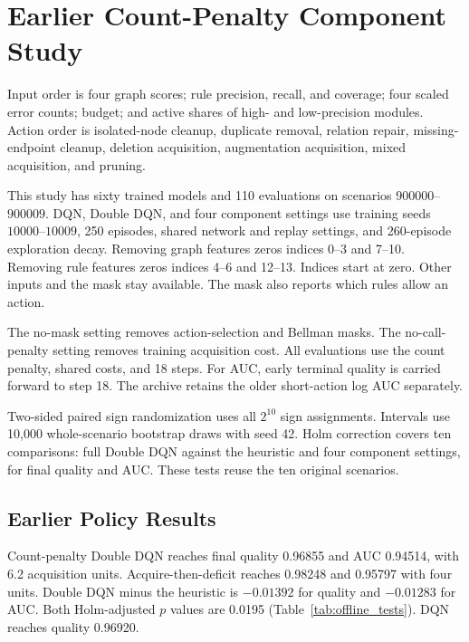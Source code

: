 \section{Earlier Count-Penalty Component Study}

\label{app:impl}

Input order is four graph scores; rule precision, recall, and coverage;
four scaled error counts; budget; and active shares of high- and
low-precision modules. Action order is isolated-node cleanup, duplicate
removal, relation repair, missing-endpoint cleanup, deletion acquisition,
augmentation acquisition, mixed acquisition, and pruning.

This study has sixty trained models and 110 evaluations on scenarios
$900000$--$900009$. DQN, Double DQN, and four component settings use
training seeds $10000$--$10009$, 250 episodes, shared network and replay
settings, and 260-episode exploration decay.
Removing graph features zeros indices 0--3 and 7--10.
Removing rule features zeros indices 4--6 and 12--13.
Indices start at zero. Other inputs and the mask stay available.
The mask also reports which rules allow an action.

The no-mask setting removes action-selection and Bellman masks.
The no-call-penalty setting removes training acquisition cost.
All evaluations use the count penalty, shared costs, and 18 steps.
For AUC, early terminal quality is carried forward to step 18.
The archive retains the older short-action log AUC separately.

Two-sided paired sign randomization uses all $2^{10}$ sign assignments.
Intervals use 10,000 whole-scenario bootstrap draws with seed 42.
Holm correction covers ten comparisons: full Double DQN against
the heuristic and four component settings, for final quality and AUC.
These tests reuse the ten original scenarios.



\subsection{Earlier Policy Results}

Count-penalty Double DQN reaches final quality 0.96855 and AUC 0.94514,
with 6.2 acquisition units. Acquire-then-deficit reaches 0.98248 and
0.95797 with four units. Double DQN minus the heuristic is $-0.01392$
for quality and $-0.01283$ for AUC. Both Holm-adjusted $p$ values are
0.0195 (Table~\ref{tab:offline_tests}). DQN reaches quality 0.96920.

